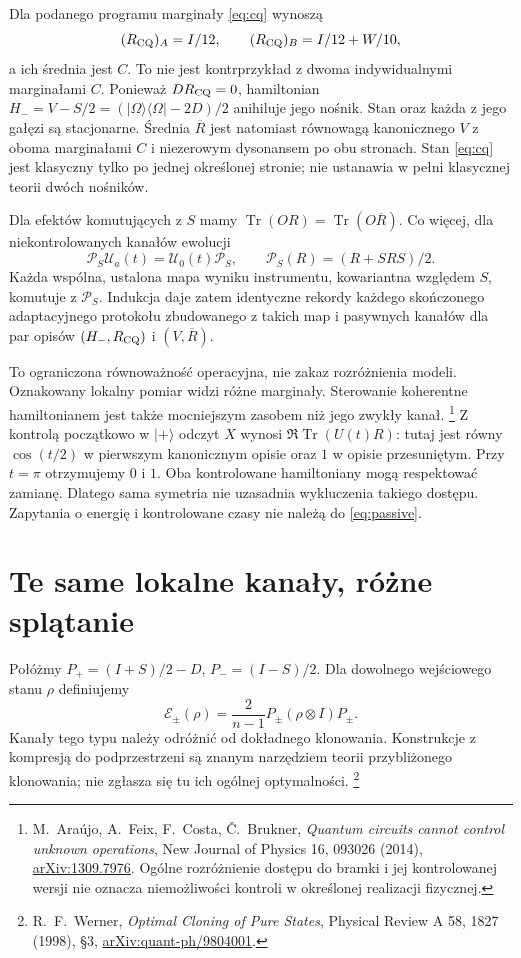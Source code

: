 \documentclass[11pt,a4paper]{article}
\newcommand{\Tr}{\operatorname{Tr}}
\begin{document}
Dla podanego programu marginały \eqref{eq:cq} wynoszą
\[
 (R_{\rm CQ})_A=I/12,\qquad
 (R_{\rm CQ})_B=I/12+W/10,
\]
a ich średnia jest $C$. To nie jest kontrprzykład z dwoma
indywidualnymi marginałami $C$.
Ponieważ $DR_{\rm CQ}=0$, hamiltonian
$H_-=V-S/2=(|\Omega\rangle\langle\Omega|-2D)/2$
anihiluje jego nośnik. Stan oraz każda z jego gałęzi są stacjonarne.
Średnia $\overline R$ jest natomiast równowagą kanonicznego $V$
z oboma marginałami $C$ i niezerowym dysonansem po obu stronach.
Stan \eqref{eq:cq} jest klasyczny tylko po jednej określonej stronie;
nie ustanawia w pełni klasycznej teorii dwóch nośników.

Dla efektów komutujących z $S$ mamy $\Tr(OR)=\Tr(O\overline R)$.
Co więcej, dla niekontrolowanych kanałów ewolucji
\begin{equation}\label{eq:passive}
 \mathcal P_S\mathcal U_a(t)=\mathcal U_0(t)\mathcal P_S,
 \qquad \mathcal P_S(R)=(R+SRS)/2.
\end{equation}
Każda wspólna, ustalona mapa wyniku instrumentu, kowariantna względem
$S$, komutuje z $\mathcal P_S$. Indukcja daje zatem identyczne rekordy
każdego skończonego adaptacyjnego protokołu zbudowanego z takich map
i pasywnych kanałów dla par opisów $(H_-,R_{\rm CQ})$ i $(V,\overline R)$.

To ograniczona równoważność operacyjna, nie zakaz rozróżnienia modeli.
Oznakowany lokalny pomiar widzi różne marginały. Sterowanie koherentne
hamiltonianem jest także mocniejszym zasobem niż jego zwykły kanał.
\footnote{M.~Araújo, A.~Feix, F.~Costa, Č.~Brukner,
\emph{Quantum circuits cannot control unknown operations},
New Journal of Physics 16, 093026 (2014),
\href{https://arxiv.org/abs/1309.7976}{arXiv:1309.7976}.
Ogólne rozróżnienie dostępu do bramki i jej kontrolowanej wersji
nie oznacza niemożliwości kontroli w określonej realizacji fizycznej.}
Z kontrolą początkowo w $|+\rangle$ odczyt $X$ wynosi
$\Re\Tr(U(t)R)$: tutaj jest równy $\cos(t/2)$ w pierwszym kanonicznym
opisie oraz $1$ w opisie przesuniętym. Przy $t=\pi$ otrzymujemy
$0$ i $1$. Oba kontrolowane hamiltoniany mogą respektować zamianę.
Dlatego sama symetria nie uzasadnia wykluczenia takiego dostępu.
Zapytania o energię i kontrolowane czasy nie należą do \eqref{eq:passive}.

\section{Te same lokalne kanały, różne splątanie}

Połóżmy $P_+=(I+S)/2-D$, $P_-=(I-S)/2$.
Dla dowolnego wejściowego stanu $\rho$ definiujemy
\begin{equation}\label{eq:channels}
 \mathcal E_\pm(\rho)=\frac2{n-1}P_\pm(\rho\otimes I)P_\pm.
\end{equation}
Kanały tego typu należy odróżnić od dokładnego klonowania.
Konstrukcje z kompresją do podprzestrzeni są znanym narzędziem
teorii przybliżonego klonowania; nie zgłasza się tu ich ogólnej optymalności.
\footnote{R.~F.~Werner, \emph{Optimal Cloning of Pure States},
Physical Review A 58, 1827 (1998), §3,
\href{https://arxiv.org/abs/quant-ph/9804001}{arXiv:quant-ph/9804001}.}
\end{document}
